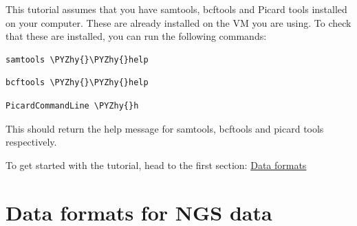 \documentclass[11pt]{article}
\makeatletter
\def\PYZhy{\char`\-}
\newcommand{\boxspacing}{\kern\kvtcb@left@rule\kern\kvtcb@boxsep}
\newcommand{\prompt}[4]{
        \ttfamily\llap{{\color{#2}\LARGE\faKeyboardO\hspace{3pt}#4}}\vspace{-\baselineskip}
    }
\makeatother
\begin{document}
This tutorial assumes that you have samtools, bcftools and Picard tools
installed on your computer. These are already installed on the VM you
are using. To check that these are installed, you can run the following
commands:

    \begin{tcolorbox}[breakable, size=fbox, boxrule=1pt, pad at break*=1mm,colback=cellbackground, colframe=cellborder]
\prompt{In}{incolor}{ }{\boxspacing}
\begin{Verbatim}[commandchars=\\\{\}]
samtools \PYZhy{}\PYZhy{}help
\end{Verbatim}
\end{tcolorbox}

    \begin{tcolorbox}[breakable, size=fbox, boxrule=1pt, pad at break*=1mm,colback=cellbackground, colframe=cellborder]
\prompt{In}{incolor}{ }{\boxspacing}
\begin{Verbatim}[commandchars=\\\{\}]
bcftools \PYZhy{}\PYZhy{}help
\end{Verbatim}
\end{tcolorbox}

    \begin{tcolorbox}[breakable, size=fbox, boxrule=1pt, pad at break*=1mm,colback=cellbackground, colframe=cellborder]
\prompt{In}{incolor}{ }{\boxspacing}
\begin{Verbatim}[commandchars=\\\{\}]
PicardCommandLine \PYZhy{}h
\end{Verbatim}
\end{tcolorbox}

    This should return the help message for samtools, bcftools and picard
tools respectively.

To get started with the tutorial, head to the first section:
\href{formats.ipynb}{Data formats}





\newpage





    \hypertarget{data-formats-for-ngs-data}{%
\section{Data formats for NGS data}\label{data-formats-for-ngs-data}}
\end{document}
